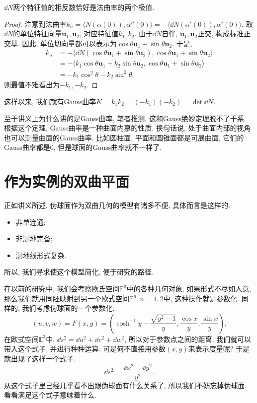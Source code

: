 \documentclass[./main.tex]{subfiles}
\begin{document}
\begin{proposition}
    \(\dd N\)两个特征值的相反数恰好是法曲率的两个极值.
\end{proposition}
\begin{proof}
    注意到法曲率\(k_n=\langle N(\alpha(0)),\alpha''(0)\rangle=-\langle \dd N(\alpha'(0)),\alpha'(0)\rangle\). 取\(\dd N\)的单位特征向量\(\mathbf{u}_1,\mathbf{u}_2\), 对应特征值\(k_1,k_2\). 由于\(\dd N\)自伴, \(\mathbf{u}_1,\mathbf{u}_2\)正交, 构成标准正交基. 因此, 单位切向量都可以表示为\(\cos\theta\mathbf{u}_1+\sin\theta\mathbf{u}_2\). 于是,
    \begin{align*}
        k_n&=-\langle\dd N(\cos\theta\mathbf{u}_1+\sin\theta\mathbf{u}_2),\cos\theta\mathbf{u}_1+\sin\theta\mathbf{u}_2\rangle\\
           &=-\langle k_1\cos\theta\mathbf{u}_1+k_2\sin\theta\mathbf{u}_2,\cos\theta\mathbf{u}_1+\sin\theta\mathbf{u}_2\rangle\\
           &=-k_1\cos^2\theta-k_2\sin^2\theta.
    \end{align*}
    则最值不难看出为\(-k_1,-k_2\).
\end{proof}
这样以来, 我们就有Gauss曲率\(K=k_1k_2=(-k_1)(-k_2)=\det\dd N\).

至于讲义上为什么讲的是Gauss曲率, 笔者推测, 这和Gauss绝妙定理脱不了干系. 根据这个定理, Gauss曲率是一种曲面内禀的性质. 换句话说, 处于曲面内部的视角也可以测量曲面的Gauss曲率. 比如圆柱面, 平面和圆锥面都是可展曲面, 它们的Gauss曲率都是\(0\), 但是球面的Gauss曲率就不一样了.
\section{作为实例的双曲平面}
正如讲义所述, 伪球面作为双曲几何的模型有诸多不便, 具体而言是这样的.
\begin{itemize}
    \item 非单连通;
    \item 非测地完备;
    \item 测地线形式复杂.
\end{itemize}
所以, 我们寻求使这个模型简化, 便于研究的路径.

在以前的研究中, 我们会考察欧氏空间\(\mathbb{E}^3\)中的各种几何对象, 如果形式不尽如人意, 那么我们就用同胚映射到另一个欧式空间\(\mathbb{E}^n,n=1,2\)中, 这种操作就是参数化. 同样的, 我们考虑伪球面的一个参数化.
\[
    (u,v,w)=F(x,y)=\left(\cosh^{-1}y-\frac{\sqrt{y^2-1}}{y},\frac{\cos x}{y},\frac{\sin x}{y}\right).
\]
在欧式空间\(\mathbb{E}^3\)中, \(\dd s^2=\dd u^2+\dd v^2+\dd w^2\), 所以对于参数点之间的距离, 我们就可以带入这个式子, 并进行种种运算. 可是何不直接用参数\((x,y)\)来表示度量呢? 于是就出现了这样一个式子.
\begin{equation}\label{equ:3}
    \dd s^2=\frac{\dd x^2+\dd y^2}{y^2}.
\end{equation}
从这个式子里已经几乎看不出跟伪球面有什么关系了, 所以我们不妨忘掉伪球面, 看看满足这个式子意味着什么.
\end{document}
